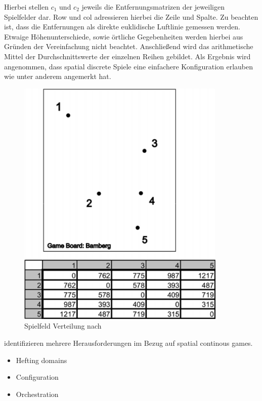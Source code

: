 Hierbei stellen $c_1$ und $c_2$ jeweils die Entfernungsmatrizen der jeweiligen Spielfelder dar.
Row und col adressieren hierbei die Zeile und Spalte.
Zu beachten ist, dass die Entfernungen als direkte euklidische Luftlinie gemessen werden. Etwaige Höhenunterschiede, sowie örtliche Gegebenheiten werden hierbei aus Gründen der Vereinfachung nicht beachtet. Anschließend wird das arithmetische Mittel der Durchschnittswerte der einzelnen Reihen gebildet.
Als Ergebnis wird angenommen, dass spatial discrete Spiele eine einfachere Konfiguration erlauben wie unter anderem \textcite{Benford.2005} angemerkt hat.

\begin{figure}[H]
\begin{center}
\includegraphics[width=100mm]{images/ch3_img03b_distributed.png}
\caption{Spielfeld Verteilung nach \textcite{Kiefer.2007}}
\label{img:ch3_img03b_distributed}
\end{center}
\end{figure}

\textcite{Benford.2005} identifizieren mehrere Herausforderungen im Bezug auf spatial continous games.

\begin{itemize}
\item Hefting domains
\item Configuration
\item Orchestration
\end{itemize}

